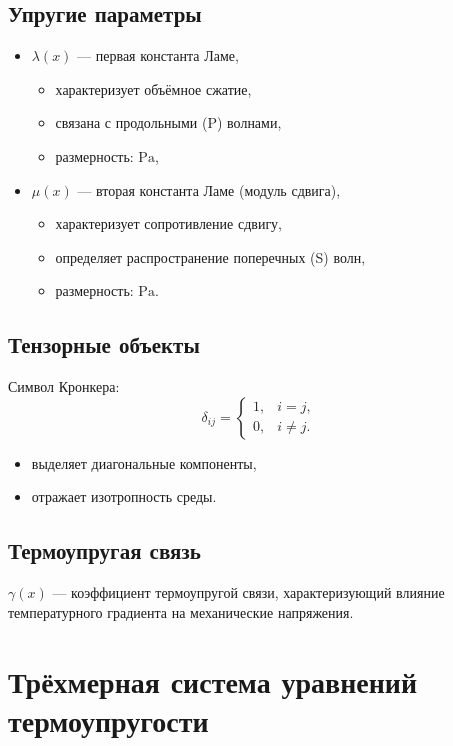 \subsection{Упругие параметры}

\begin{itemize}
    \item $\lambda(x)$ — первая константа Ламе,
    \begin{itemize}
        \item характеризует объёмное сжатие,
        \item связана с продольными (P) волнами,
        \item размерность: $\mathrm{Pa}$,
    \end{itemize}
    \item $\mu(x)$ — вторая константа Ламе (модуль сдвига),
    \begin{itemize}
        \item характеризует сопротивление сдвигу,
        \item определяет распространение поперечных (S) волн,
        \item размерность: $\mathrm{Pa}$.
    \end{itemize}
\end{itemize}

\subsection{Тензорные объекты}

Символ Кронкера:
\[
\delta_{ij}
=
\begin{cases}
1, & i=j, \\
0, & i \neq j.
\end{cases}
\]

\begin{itemize}
    \item выделяет диагональные компоненты,
    \item отражает изотропность среды.
\end{itemize}

\subsection{Термоупругая связь}

$\gamma(x)$ — коэффициент термоупругой связи, характеризующий влияние температурного градиента на механические напряжения.


\section*{Трёхмерная система уравнений термоупругости}

